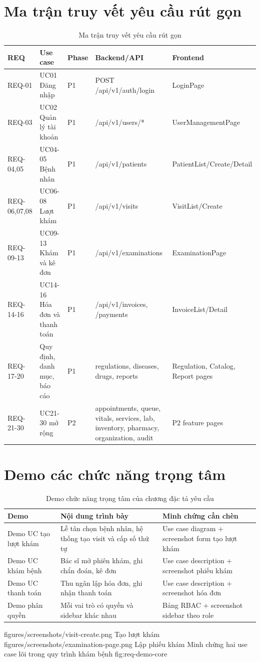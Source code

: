 \section{Ma trận truy vết yêu cầu rút gọn}

\begin{longtable}{|p{1.6cm}|p{3.3cm}|p{2.4cm}|p{3.8cm}|p{3cm}|}
\caption{Ma trận truy vết yêu cầu rút gọn}\\
\hline
\textbf{REQ} & \textbf{Use case} & \textbf{Phase} & \textbf{Backend/API} & \textbf{Frontend} \\
\hline
REQ-01 & UC01 Đăng nhập & P1 & POST /api/v1/auth/login & LoginPage \\
\hline
REQ-03 & UC02 Quản lý tài khoản & P1 & /api/v1/users/* & UserManagementPage \\
\hline
REQ-04,05 & UC04-05 Bệnh nhân & P1 & /api/v1/patients & PatientList/Create/Detail \\
\hline
REQ-06,07,08 & UC06-08 Lượt khám & P1 & /api/v1/visits & VisitList/Create \\
\hline
REQ-09-13 & UC09-13 Khám và kê đơn & P1 & /api/v1/examinations & ExaminationPage \\
\hline
REQ-14-16 & UC14-16 Hóa đơn và thanh toán & P1 & /api/v1/invoices, /payments & InvoiceList/Detail \\
\hline
REQ-17-20 & Quy định, danh mục, báo cáo & P1 & regulations, diseases, drugs, reports & Regulation, Catalog, Report pages \\
\hline
REQ-21-30 & UC21-30 mở rộng & P2 & appointments, queue, vitals, services, lab, inventory, pharmacy, organization, audit & P2 feature pages \\
\hline
\end{longtable}

\section{Demo các chức năng trọng tâm}

\begin{longtable}{|p{3.2cm}|p{5.2cm}|p{5.5cm}|}
\caption{Demo chức năng trọng tâm của chương đặc tả yêu cầu}\\
\hline
\textbf{Demo} & \textbf{Nội dung trình bày} & \textbf{Minh chứng cần chèn} \\
\hline
Demo UC tạo lượt khám & Lễ tân chọn bệnh nhân, hệ thống tạo visit và cấp số thứ tự & Use case diagram + screenshot form tạo lượt khám \\
\hline
Demo UC khám bệnh & Bác sĩ mở phiên khám, ghi chẩn đoán, kê đơn & Use case description + screenshot phiếu khám \\
\hline
Demo UC thanh toán & Thu ngân lập hóa đơn, ghi nhận thanh toán & Use case description + screenshot hóa đơn \\
\hline
Demo phân quyền & Mỗi vai trò có quyền và sidebar khác nhau & Bảng RBAC + screenshot sidebar theo role \\
\hline
\end{longtable}

\TwoDemoFigures
{figures/screenshots/visit-create.png}
{Tạo lượt khám}
{figures/screenshots/examination-page.png}
{Lập phiếu khám}
{Minh chứng hai use case lõi trong quy trình khám bệnh}
{fig:req-demo-core}

